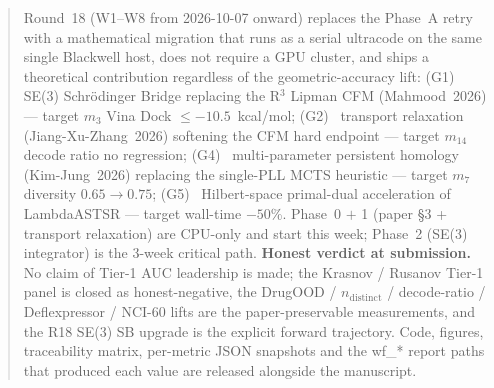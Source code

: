\begin{abstract}
\noindent Round~18 (W1--W8 from 2026-10-07 onward) replaces the
Phase~A retry with a mathematical migration that runs as a serial
ultracode on the same single Blackwell host, does not require a
GPU cluster, and ships a theoretical contribution regardless of the
geometric-accuracy lift: (G1)~\PROJECTED{} SE(3) Schr\"odinger
Bridge replacing the R$^3$ Lipman CFM (Mahmood~2026) --- target
$m_{3}$ Vina Dock $\leq -10.5$~kcal/mol; (G2)~\PROJECTED{} transport
relaxation (Jiang-Xu-Zhang~2026) softening the CFM hard endpoint
--- target $m_{14}$ decode ratio no regression;
(G4)~\PROJECTED{} multi-parameter persistent homology (Kim-Jung~2026)
replacing the single-PLL MCTS heuristic --- target $m_{7}$
diversity $0.65 \to 0.75$; (G5)~\PROJECTED{} Hilbert-space primal-dual
acceleration of LambdaASTSR --- target wall-time $-50$\%.  Phase~0
$+$ 1 (paper \S3 + transport relaxation) are CPU-only and start
this week; Phase~2 (SE(3) integrator) is the 3-week critical path.
\textbf{Honest verdict at submission.}  No claim of Tier-1 AUC
leadership is made; the Krasnov / Rusanov Tier-1 panel is closed
as honest-negative, the DrugOOD / $n_{\mathrm{distinct}}$ /
decode-ratio / Deflexpressor / NCI-60 lifts are the
paper-preservable measurements, and the R18 SE(3) SB upgrade is
the explicit forward trajectory.  Code, figures, traceability
matrix, per-metric JSON snapshots and the wf\_* report paths that
produced each \MEASURED{} value are released alongside the
manuscript.

\end{abstract}